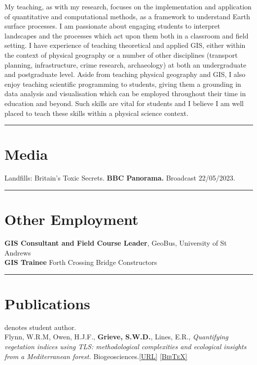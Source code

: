\documentclass[10pt, a4paper]{article}
\newcommand{\doi}[1]{\href{https://dx.doi.org/#1}{\scriptsize\textsc{[URL]}}}
\newcommand{\bib}[1]{\href{https://www.doi2bib.org/bib/#1}{\scriptsize\textsc{[BibTeX]}}}
\newcommand{\paperlinks}[1]{\doi{#1} \bib{#1}}
\newcommand{\student}{\textbf{\textsuperscript{\textdagger}}}
\newcommand{\years}[1]{\marginnote{\scriptsize #1}}
\begin{document}
  My teaching, as with my research, focuses on the implementation and application of quantitative and computational methods, as a framework to understand Earth surface processes. I am passionate about engaging students to interpret landscapes and the processes which act upon them both in a classroom and field setting. I have experience of teaching theoretical and applied GIS, either within the context of physical geography or a number of other disciplines (transport planning, infrastructure, crime research, archaeology) at both an undergraduate and postgraduate level. Aside from teaching physical geography and GIS, I also enjoy teaching scientific programming to students, giving them a grounding in data analysis and visualisation which can be employed throughout their time in education and beyond. Such skills are vital for students and I believe I am well placed to teach these skills within a physical science context.\\[0.05cm]

\fi

\hrule
\section*{Media}
\noindent

\years{2023}Landfills: Britain's Toxic Secrets. \textbf{BBC Panorama.} Broadcast 22/05/2023.\\[0.05cm]

\hrule
\section*{Other Employment}
\noindent

\years{2015--2016} \textbf{GIS Consultant and Field Course Leader}, GeoBus, University of St Andrews\\[0.05cm]
\years{2012--2013} \textbf{GIS Trainee} Forth Crossing Bridge Constructors\\[0.05cm]

\hrule
\section*{Publications}
\noindent
\student denotes student author.\\[0.05cm]

\years{2023}Flynn, W.R.M\student, Owen, H.J.F., \textbf{Grieve, S.W.D.}, Lines, E.R., \textit{Quantifying vegetation indices using TLS: methodological complexities and ecological insights from a Mediterranean forest.} Biogeosciences.\paperlinks{10.5194/bg-20-2769-2023} \\[0.05cm]
\end{document}
